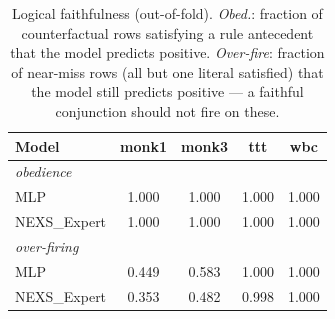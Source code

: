 \begin{table}[t]\centering
\small
\caption{Logical faithfulness (out-of-fold). \emph{Obed.}: fraction of counterfactual rows satisfying a rule antecedent that the model predicts positive. \emph{Over-fire}: fraction of near-miss rows (all but one literal satisfied) that the model still predicts positive --- a faithful conjunction should not fire on these.}
\label{tab:faithfulness}
\begin{tabular}{lcccc}
\toprule
Model & monk1 & monk3 & ttt & wbc \\
\midrule
\multicolumn{5}{l}{\textit{obedience}} \\
MLP & 1.000 & 1.000 & 1.000 & 1.000 \\
NEXS\_Expert & 1.000 & 1.000 & 1.000 & 1.000 \\
\midrule
\multicolumn{5}{l}{\textit{over-firing}} \\
MLP & 0.449 & 0.583 & 1.000 & 1.000 \\
NEXS\_Expert & 0.353 & 0.482 & 0.998 & 1.000 \\
\bottomrule
\end{tabular}
\end{table}